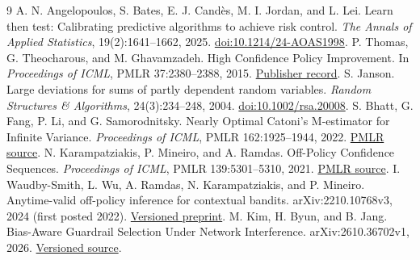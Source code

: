 \documentclass[10pt]{article}
\begin{document}
\begin{thebibliography}{9}
A. N. Angelopoulos, S. Bates, E. J. Cand\`es, M. I. Jordan, and L. Lei.
Learn then test: Calibrating predictive algorithms to achieve risk control.
\emph{The Annals of Applied Statistics}, 19(2):1641--1662, 2025.
\href{https://doi.org/10.1214/24-AOAS1998}{doi:10.1214/24-AOAS1998}.
P. Thomas, G. Theocharous, and M. Ghavamzadeh.
High Confidence Policy Improvement.
In \emph{Proceedings of ICML}, PMLR 37:2380--2388, 2015.
\href{https://proceedings.mlr.press/v37/thomas15.html}{Publisher record}.
S. Janson. Large deviations for sums of partly dependent random variables.
\emph{Random Structures \& Algorithms}, 24(3):234--248, 2004.
\href{https://doi.org/10.1002/rsa.20008}{doi:10.1002/rsa.20008}.
S. Bhatt, G. Fang, P. Li, and G. Samorodnitsky.
Nearly Optimal Catoni's M-estimator for Infinite Variance.
\emph{Proceedings of ICML}, PMLR 162:1925--1944, 2022.
\href{https://proceedings.mlr.press/v162/bhatt22b.html}{PMLR source}.
N. Karampatziakis, P. Mineiro, and A. Ramdas.
Off-Policy Confidence Sequences.
\emph{Proceedings of ICML}, PMLR 139:5301--5310, 2021.
\href{https://proceedings.mlr.press/v139/karampatziakis21a.html}{PMLR source}.
I. Waudby-Smith, L. Wu, A. Ramdas, N. Karampatziakis, and P. Mineiro.
Anytime-valid off-policy inference for contextual bandits.
arXiv:2210.10768v3, 2024 (first posted 2022).
\href{https://arxiv.org/abs/2210.10768v3}{Versioned preprint}.
M. Kim, H. Byun, and B. Jang.
Bias-Aware Guardrail Selection Under Network Interference.
arXiv:2610.36702v1, 2026.
\href{https://arxiv.org/html/2610.36702v1}{Versioned source}.
\end{thebibliography}
\appendix



\clearpage

\end{document}
